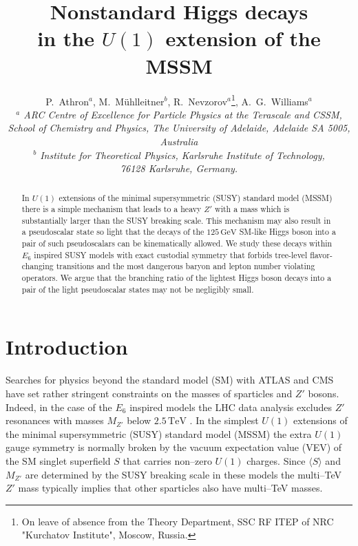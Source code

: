 \documentclass[12pt,a4paper]{article}
\begin{document}
\title{
\textbf{Nonstandard Higgs decays\\ in the $U(1)$ extension of the MSSM\\[4mm]}}

\date{}
\author{
P.~Athron${}^{a}$,
M.~M\"{u}hlleitner$^{b}$,
R.~Nevzorov${}^{a}$\footnote{On leave of absence from the Theory Department, SSC RF ITEP of NRC "Kurchatov Institute", Moscow, Russia.},
A.~G.~Williams${}^{a}$\\[9mm]
{\small\it $^a$ ARC Centre of Excellence for Particle Physics at the Terascale and CSSM,}\\
{\small\it School of Chemistry and Physics, The University of Adelaide, Adelaide SA 5005, Australia}\\[3mm]
{\small\it $^b$ Institute for Theoretical Physics, Karlsruhe Institute of Technology,} \\
{\small\it 76128 Karlsruhe, Germany.}\\
}

\maketitle

\begin{abstract}
\noindent
In $U(1)$ extensions of the minimal supersymmetric (SUSY) standard
model (MSSM) there is a simple mechanism that leads to a heavy $Z'$
with a mass which is substantially larger than the SUSY breaking
scale. This mechanism may also result in a pseudoscalar state so light
that the decays of the $125\,\mbox{GeV}$ SM-like Higgs boson into a
pair of such pseudoscalars can be kinematically allowed.  We study
these decays within $E_6$ inspired SUSY models with exact custodial
symmetry that forbids tree-level flavor-changing transitions and the
most dangerous baryon and lepton number violating operators. We argue
that the branching ratio of the lightest Higgs boson decays into a
pair of the light pseudoscalar states may not be negligibly small.
\end{abstract}
\thispagestyle{empty}
\vfill
\newpage
\setcounter{page}{1}



\section{Introduction}
Searches for physics beyond the standard model (SM) with ATLAS and CMS
have set rather stringent constraints on the masses of sparticles and
$Z'$ bosons. Indeed, in the case of the $E_6$ inspired models the LHC
data analysis excludes $Z'$ resonances with masses $M_{Z'}$ below
$2.5\,\mbox{TeV}$ \cite{1,2}. In the simplest $U(1)$ extensions of the
minimal supersymmetric (SUSY) standard model (MSSM) the extra $U(1)$
gauge symmetry is normally broken by the vacuum expectation value
(VEV) of the SM singlet superfield $S$ that carries non--zero $U(1)$
charges. Since $\langle S\rangle$ and $M_{Z'}$ are determined by the
SUSY breaking scale in these models the multi--TeV $Z'$ mass typically
implies that other sparticles also have multi--TeV masses.
\end{document}
